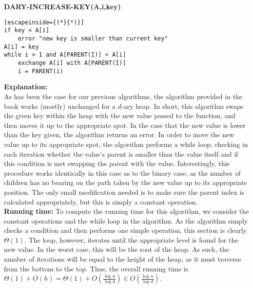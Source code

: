 \documentclass{article}
\begin{document}
\begin{enumerate}
\begin{enumerate}
\\\\ \textbf{DARY-INCREASE-KEY(A,i,key)}
\begin{lstlisting}[escapeinside={(*}{*)}]
if key < A[i]
	error "new key is smaller than current key"
A[i] = key
while i > 1 and A[PARENT(I)] < A[i]
	exchange A[i] with A[PARENT(I)]
	i = PARENT(i)
\end{lstlisting}
 \textbf{Explanation:} 
\\ As has been the case for our previous algorithms, the algorithm provided in the book works (mostly) unchanged for a $d$-ary heap. In short, this algorithm swaps the given key within the heap with the new value passed to the function, and then moves it up to the appropriate spot. In the case that the new value is lower than the key given, the algorithm returns an error. In order to move the new value up to its appropriate spot, the algorithm performs a while loop, checking in each iteration whether the value's parent is smaller than the value itself and if this condition is met swapping the parent with the value. Interestingly, this procedure works identically in this case as to the binary case, as the number of children has no bearing on the path taken by the new value up to its appropriate position. The only small modification needed is to make sure the parent index is calculated appropriately, but this is simply a constant operation.
\\ \textbf{Running time:}
To compute the running time for this algorithm, we consider the constant operations and the while loop in the algorithm. As the algorithm simply checks a condition and then performs one simple operation, this section is clearly $\Theta(1)$. The loop, however, iterates until the appropriate level is found for the new value. In the worst case, this will be the root of the heap. As such, the number of iterations will be equal to the height of the heap, as it must traverse from the bottom to the top. Thus, the overall running time is $\Theta
(1)+O(h)=\Theta(1)+O(\frac{\log n}{\log d})\in O(\frac{\log n}{\log d})$.
	\end{enumerate}
\end{enumerate}
	
\end{document}
